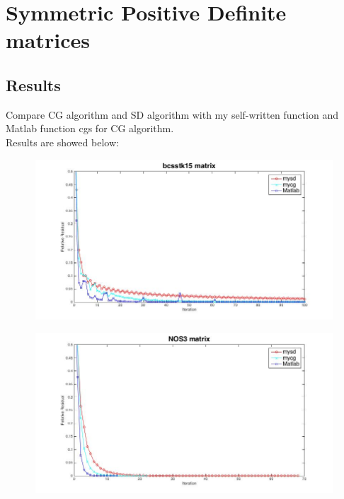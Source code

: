 \documentclass[fleqn]{article}
\begin{document}
\section{Symmetric Positive Definite matrices}
\subsection{Results}

  Compare CG algorithm and SD algorithm with my self-written function and Matlab function cgs for CG algorithm.\\[1ex]  
\newline
  Results are showed below:\\[1ex] 
      \begin{figure}[h]
      \centering
      \includegraphics[width = 16cm, height = 6cm]{bc1.jpg}
      \end{figure}
      
      \begin{figure}[h]
      \centering
      \includegraphics[width = 16cm, height = 6cm]{no2.jpg}
      \end{figure}
      
      
      
 \newline
 \newline
 \newline
 \newline
 \newpage
\end{document}

